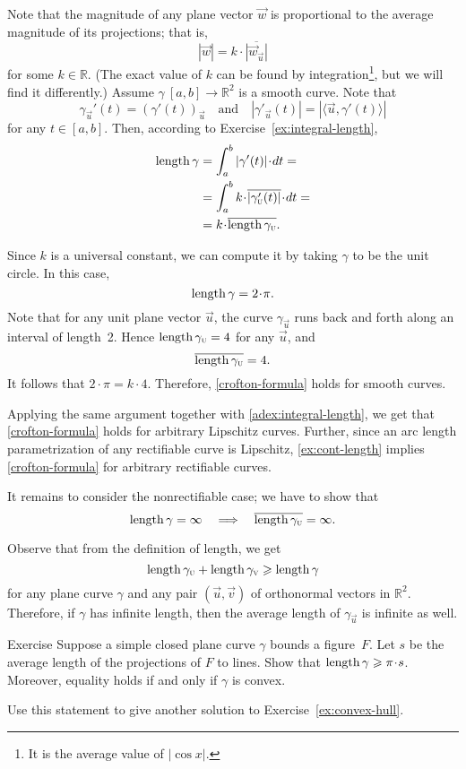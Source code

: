 Note that the magnitude of any plane vector ${\vec w}$ is proportional to the average magnitude of its projections; that is,
\[|{\vec w}|=k\cdot \overline{|{\vec w}_{\vec u}|}\]
for some $k \in \mathbb{R}$.
(The exact value of $k$ can be found by integration\footnote{It is the average value of $|\cos x|$.}, but we will find it differently.)
Assume $\gamma\:[a,b]\to\mathbb{R}^2$ is a smooth curve.
Note that 
\[\gamma_{\vec u}'(t)=(\gamma'(t))_{\vec u}
\quad\text{and}\quad
|\gamma'_{\vec u}(t)|=|\langle\vec u,\gamma'(t)\rangle|\]
for any $t \in [a,b]$. Then, according to Exercise~\ref{ex:integral-length},
\begin{align*}
\length\gamma
&=\int_a^b|\gamma'(t)|\cdot dt=
\\
&=\int_a^b  k\cdot \overline{|\gamma_{\vec u}'(t)|}\cdot dt=
\\
&=k\cdot \overline{\length\gamma_{\vec u}}.
\end{align*}

Since $k$ is a universal constant, we can compute it by taking $\gamma$ to be the unit circle.
In this case,
\[\length \gamma=2\cdot\pi.\]
Note that for any unit plane vector ${\vec u}$, the curve $\gamma_{\vec u}$ runs back and forth along an interval of length~2.
Hence $\mathop{\rm length}\nolimits\gamma_{\text{\sc{u}}}=4$ for any $\vec u$, and 
\[\overline{\mathop{\rm length}\nolimits\gamma_{\text{\sc{u}}}} =4.\]
It follows that $2\cdot \pi =k\cdot 4$.
Therefore, \ref{crofton-formula} holds for smooth curves.

Applying the same argument together with \ref{adex:integral-length}, we get that \ref{crofton-formula} holds for arbitrary Lipschitz curves.
Further, since an arc length parametrization of any rectifiable curve is Lipschitz, \ref{ex:cont-length} implies \ref{crofton-formula} for arbitrary rectifiable curves.

It remains to consider the nonrectifiable case;
we have to show that 
\[\mathop{\rm length}\nolimits\gamma=\infty
\quad\Longrightarrow\quad
\overline{\mathop{\rm length}\nolimits\gamma_{\text{\sc{u}}}}=\infty.
\]

Observe that from the definition of length, we get
\[\mathop{\rm length}\nolimits\gamma_{\text{\sc{u}}}+\mathop{\rm length}\nolimits\gamma_{\text{\sc{v}}}\geqslant \mathop{\rm length}\nolimits\gamma\]
for any plane curve $\gamma$ and any pair $(\vec u , \vec v )$ of orthonormal vectors in $\mathbb{R}^2$.
Therefore, if $\gamma$ has infinite length, then the average length of $\gamma_{\vec u}$ is infinite as well.
\qeds

\begin{thm}{Exercise}\label{ex:convex-croftons}
Suppose a simple closed plane curve $\gamma$ bounds a figure~$F$.
Let $s$ be the average length of the projections of $F$ to lines.
Show that $\length\gamma\ge \pi \cdot s$.
Moreover, equality holds if and only if $\gamma$ is convex.

Use this statement to give another solution to Exercise~\ref{ex:convex-hull}.
\end{thm}

